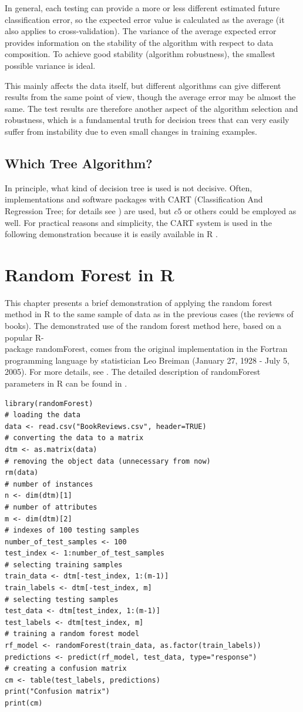 In general, each testing can provide a more or less different estimated future classification error, so the expected error value is calculated as the average (it also applies to cross-validation). The variance of the average expected error provides information on the stability of the algorithm with respect to data composition. To achieve good stability (algorithm robustness), the smallest possible variance is ideal.

This mainly affects the data itself, but different algorithms can give different results from the same point of view, though the average error may be almost the same. The test results are therefore another aspect of the algorithm selection and robustness, which is a fundamental truth for decision trees that can very easily suffer from instability due to even small changes in training examples.

\subsection{Which Tree Algorithm?}
In principle, what kind of decision tree is used is not decisive. Often, implementations and software packages with CART (Classification And Regression Tree; for details see \cite{ref36}) are used, but $c 5$ or others could be employed as well. For practical reasons and simplicity, the CART system is used in the following demonstration because it is easily available in R .

\section{Random Forest in R}
This chapter presents a brief demonstration of applying the random forest method in R to the same sample of data as in the previous cases (the reviews of books). The demonstrated use of the random forest method here, based on a popular R-\\[0pt]
package randomForest, comes from the original implementation in the Fortran programming language by statistician Leo Breiman (January 27, 1928 - July 5, 2005). For more details, see \cite{ref33,ref34,ref35}. The detailed description of randomForest parameters in R can be found in \cite{ref171}.

\begin{verbatim}
library(randomForest)
# loading the data
data <- read.csv("BookReviews.csv", header=TRUE)
# converting the data to a matrix
dtm <- as.matrix(data)
# removing the object data (unnecessary from now)
rm(data)
# number of instances
n <- dim(dtm)[1]
# number of attributes
m <- dim(dtm)[2]
# indexes of 100 testing samples
number_of_test_samples <- 100
test_index <- 1:number_of_test_samples
# selecting training samples
train_data <- dtm[-test_index, 1:(m-1)]
train_labels <- dtm[-test_index, m]
# selecting testing samples
test_data <- dtm[test_index, 1:(m-1)]
test_labels <- dtm[test_index, m]
# training a random forest model
rf_model <- randomForest(train_data, as.factor(train_labels))
predictions <- predict(rf_model, test_data, type="response")
# creating a confusion matrix
cm <- table(test_labels, predictions)
print("Confusion matrix")
print(cm)
\end{verbatim}

